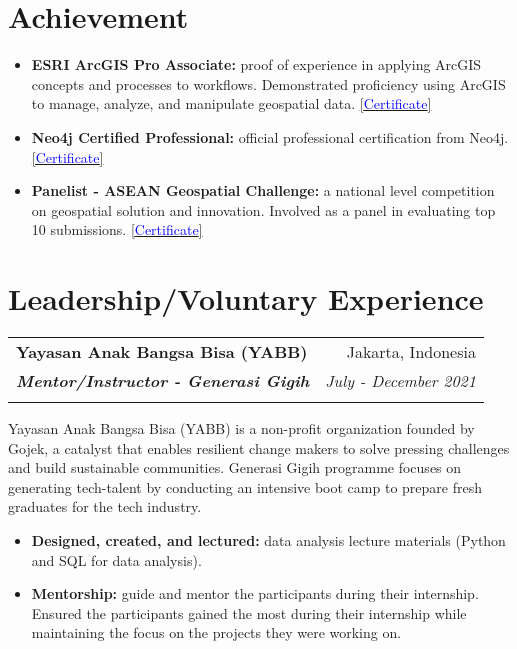 \documentclass[a4paper, 11pt]{article}
\makeatletter
\newcommand{\resumeItem}[2]{
    \item\small{
        \textbf{#1}{#2 \vspace{-2pt}}
    }
}
\newcommand{\resumeSubheading}[4]{
    \vspace{-1pt}
    \begin{tabular*}{\textwidth}{l@{\extracolsep{\fill}}r}
        \color{lightblue}\textbf{#1} & #2 \\
        \textbf{\textit{\small#3}} & \textit{\small #4} \\
        \textnormal{}\vspace{-5pt}
    \end{tabular*}\vspace{-5pt}
}
\newcommand{\resumeItemListStart}{\begin{itemize}[leftmargin=*]\setlength\itemsep{0em}\vspace{-1pt}}
\newcommand{\resumeItemListEnd}{\end{itemize}\vspace{-5pt}}
\makeatother
\begin{document}
    \vspace{-20pt}
    \section{Achievement}
    \resumeItemListStart

    \resumeItem{ESRI ArcGIS Pro Associate:}{ proof of experience in applying ArcGIS concepts and processes to workflows. Demonstrated proficiency using ArcGIS to manage, analyze, and manipulate geospatial data.
    \href{https://www.credly.com/badges/b75a29fc-af70-44c0-8945-9f3ed80196f3/}{[\textcolor{blue}{Certificate}]}}

    \resumeItem{Neo4j Certified Professional:}{ official professional certification from 
    Neo4j.
    \href{https://graphacademy.neo4j.com/c/4cb304b6-5a5b-4f45-96cf-1840a2982e55/}{[\textcolor{blue}{Certificate}]}}

    \resumeItem{Panelist - ASEAN Geospatial Challenge:}{ a national level competition on 
    geospatial solution and innovation. Involved as a panel in evaluating top 10 submissions.
    \href{https://drive.google.com/file/d/1NkMhFTBGqnOs2HpcvlLVMFIajq2MSO9k/view?usp=sharing}{[\textcolor{blue}{Certificate}]}}

    \resumeItemListEnd

    \vspace{-5pt}
    \section{Leadership/Voluntary Experience}

    \resumeSubheading
    {Yayasan Anak Bangsa Bisa (YABB)}
    {Jakarta, Indonesia}
    {Mentor/Instructor - Generasi Gigih}
    {July - December 2021}
    \small{Yayasan Anak Bangsa Bisa (YABB) is a non-profit organization founded by Gojek, a
    catalyst that enables resilient change makers to solve pressing challenges and build
    sustainable communities. Generasi Gigih programme focuses on generating tech-talent
    by conducting an intensive boot camp to prepare fresh graduates for the tech industry.}
    \vspace{-1pt}
    \resumeItemListStart
    \resumeItem{Designed, created, and lectured:}{ data analysis lecture materials (Python and SQL
    for data analysis).}
    \resumeItem{Mentorship:}{ guide and mentor the participants during their internship. Ensured the participants gained the most during their internship while maintaining the focus on the projects they were working on.}
    \resumeItemListEnd
\end{document}
